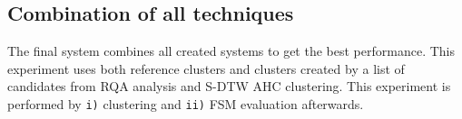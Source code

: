 \documentclass{ExcelAtFIT}
\begin{document}
\begin{table}[hbt]
\centering
\caption{Processing time of RQA system.}
\label{tab:ClusteringEvaluationTime}
\end{table}

\subsection{Combination of all techniques}
The final system combines all created systems to get the best performance. This experiment uses both reference clusters and clusters created by a list of candidates from RQA analysis and S-DTW AHC clustering.
This experiment is performed by \texttt{i)} clustering and \texttt{ii)} FSM evaluation afterwards.  
\end{document}
